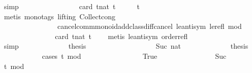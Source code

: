 \begin{isabellebody}
\ simp\isanewline
\ \ \ \ \ \ \ \ \ \ \isamarkupfalse%
\ \isamarkupfalse%
\ {\isacartoucheopen}{\isachardot}{\isachardot}{\isachardot}\ {\isasymle}\ \ card\ {\isacharbraceleft}t{\isacharcolon}{\isacharcolon}nat{\isachardot}\ t\ {\isasymle}\ {}\ {\isasymand}\ {}\ {\isasymle}\ t{\isacharbraceright}{\isacartoucheclose}\isanewline
\ \ \ \ \ \ \ \ \ \ \ \ \isamarkupfalse%
\ {\isacharparenleft}metis\ {\isacharparenleft}mono{\isacharunderscore}tags{\isacharcomma}\ lifting{\isacharparenright}\ Collect{\isacharunderscore}cong\isanewline
\ \ \ \ \ \ \ \ \ \ \ \ \ \ \ \ cancel{\isacharunderscore}comm{\isacharunderscore}monoid{\isacharunderscore}add{\isacharunderscore}class{\isachardot}diff{\isacharunderscore}cancel\ le{\isacharunderscore}antisym\ le{\isacharunderscore}refl\ mod{\isacharunderscore}{}{\isacharparenright}\isanewline
\ \ \ \ \ \ \ \ \ \ \isamarkupfalse%
\ \isamarkupfalse%
\ {\isacartoucheopen}{\isachardot}{\isachardot}{\isachardot}\ {\isacharequal}\ card\ {\isacharbraceleft}t{\isacharcolon}{\isacharcolon}nat{\isachardot}\ t\ {\isacharequal}\ {}{\isacharbraceright}{\isacartoucheclose}\ \isamarkupfalse%
\ {\isacharparenleft}metis\ le{\isacharunderscore}antisym\ order{\isacharunderscore}refl{\isacharparenright}\isanewline
\ \ \ \ \ \ \ \ \ \ \isamarkupfalse%
\ \isamarkupfalse%
\ {\isacartoucheopen}{\isachardot}{\isachardot}{\isachardot}\ {\isacharequal}\ {}{\isacartoucheclose}\ \isamarkupfalse%
\ simp\isanewline
\ \ \ \ \ \ \ \ \ \ \isamarkupfalse%
\ \isamarkupfalse%
\ {\isacharquery}thesis\ \isacommand{{\isachardot}}\isamarkupfalse%
\ \isanewline
\ \ \ \ \ \ \isamarkupfalse%
\isanewline
\ \ \ \ \ \ \ \ \isamarkupfalse%
\ {\isacharparenleft}Suc\ nat{\isacharparenright}\isanewline
\ \ \ \ \ \ \ \ \ \ \isamarkupfalse%
\ \isamarkupfalse%
\ {\isacharquery}thesis\isanewline
\ \ \ \ \ \ \ \ \ \ \isamarkupfalse%
\ {\isacharparenleft}cases\ {\isacartoucheopen}{\isacharparenleft}t\ mod\ {}\ {\isacharequal}\ {}{\isacartoucheclose}{\isacharparenright}\isanewline
\ \ \ \ \ \ \ \ \ \ \ \ \isamarkupfalse%
\ True\isanewline
\ \ \ \ \ \ \ \ \ \ \ \ \ \ \isamarkupfalse%
\ Suc\ \isamarkupfalse%
\ {\isacartoucheopen}t\ mod\ {}\ {\isasymnoteq}\ {}{\isacartoucheclose}\ \isamarkupfalse%

\end{isabellebody}
